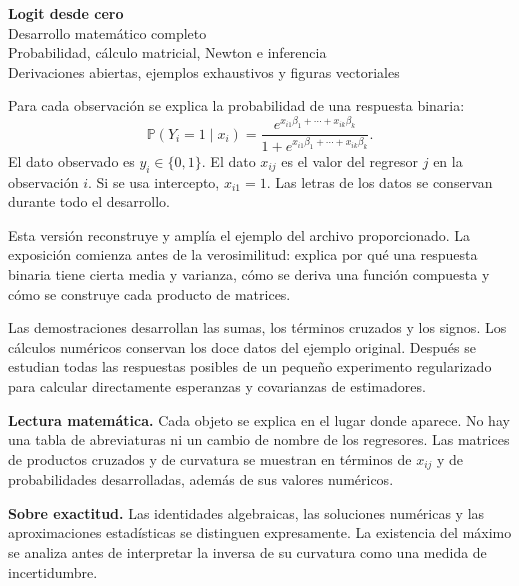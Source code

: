 \documentclass[11pt,a4paper]{article}
\newcommand{\Prob}{\mathbb P}
\begin{document}
\thispagestyle{empty}
\begin{center}
{\Huge\bfseries\color{azul}Logit desde cero}\\[10pt]
{\LARGE Desarrollo matemático completo}\\[8pt]
{\Large Probabilidad, cálculo matricial, Newton e inferencia}\\[8pt]
{\large Derivaciones abiertas, ejemplos exhaustivos y figuras vectoriales}
\end{center}
\begin{idea}
Para cada observación se explica la probabilidad de una respuesta binaria:
\[
\Prob(Y_i=1\mid x_i)
=\frac{e^{x_{i1}\beta_1+\cdots+x_{ik}\beta_k}}
{1+e^{x_{i1}\beta_1+\cdots+x_{ik}\beta_k}}.
\]
El dato observado es $y_i\in\{0,1\}$. El dato $x_{ij}$ es el valor del
regresor $j$ en la observación $i$. Si se usa intercepto, $x_{i1}=1$.
Las letras de los datos se conservan durante todo el desarrollo.
\end{idea}
Esta versión reconstruye y amplía el ejemplo del archivo proporcionado.
La exposición comienza antes de la verosimilitud: explica por qué una
respuesta binaria tiene cierta media y varianza, cómo se deriva una función
compuesta y cómo se construye cada producto de matrices.

Las demostraciones desarrollan las sumas, los términos cruzados y los signos.
Los cálculos numéricos conservan los doce datos del ejemplo original.
Después se estudian todas las respuestas posibles de un pequeño experimento
regularizado para calcular directamente esperanzas y covarianzas de estimadores.

\textbf{Lectura matemática.} Cada objeto se explica en el lugar donde aparece.
No hay una tabla de abreviaturas ni un cambio de nombre de los regresores.
Las matrices de productos cruzados y de curvatura se muestran en términos
de $x_{ij}$ y de probabilidades desarrolladas, además de sus valores numéricos.

\textbf{Sobre exactitud.} Las identidades algebraicas, las soluciones
numéricas y las aproximaciones estadísticas se distinguen expresamente.
La existencia del máximo se analiza antes de interpretar la inversa de su
curvatura como una medida de incertidumbre.

\begin{center}
\end{center}
\clearpage
\setcounter{tocdepth}{1}
\tableofcontents
\end{document}
